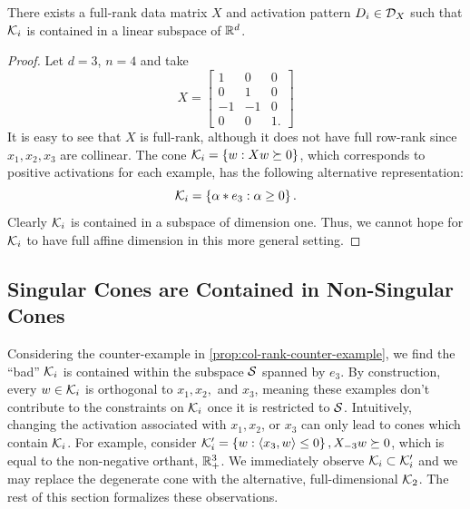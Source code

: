 \begin{proposition}\label{prop:col-rank-counter-example}
    There exists a full-rank data matrix \( X \) and activation pattern \( D_i \in \mathcal{D}_X \) such that \( \mathcal{K}_i \) is contained in a linear subspace of \( \mathbb{R}^d \).
\end{proposition}
\begin{proof}
    Let \( d = 3 \), \( n = 4 \) and take
    \begin{equation*}
        X =
        \begin{bmatrix}
            1  & 0  & 0  \\
            0  & 1  & 0  \\
            -1 & -1 & 0  \\
            0  & 0  & 1.
        \end{bmatrix}
    \end{equation*}
    It is easy to see that \( X \) is full-rank, although it does not have full row-rank since \( x_1, x_2, x_3 \) are collinear.
    The cone \( \mathcal{K}_i = \left\{ w : X w \succeq 0 \right\} \), which corresponds to positive activations for each example, has the following alternative representation:
    \[
        \mathcal{K}_i = \left\{\alpha * e_3 : \alpha \geq 0 \right\}.
    \]
    Clearly \( \mathcal{K}_i \) is contained in a subspace of dimension one.
    Thus, we cannot hope for \( \mathcal{K}_i \) to have full affine dimension in this more general setting.
\end{proof}

\subsection{Singular Cones are Contained in Non-Singular Cones}\label{app:singular-cones}

Considering the counter-example in \cref{prop:col-rank-counter-example}, we find the ``bad'' \( \mathcal{K}_i \) is contained within the subspace \( \mathcal{S} \) spanned by \( e_3 \).
By construction, every \( w \in \mathcal{K}_i \) is orthogonal to \( x_1, x_2, \) and \( x_3 \), meaning these examples don't contribute to the constraints on \( \mathcal{K}_i \) once it is restricted to \( \mathcal{S} \).
Intuitively, changing the activation associated with \( x_1, x_2 \), or \( x_3 \) can only lead to cones which contain \( \mathcal{K}_i \).
For example, consider \( \mathcal{K}_i' = \left\{w : \left\langle x_3, w\right\rangle \leq 0\right\}, X_{-3} w \succeq 0 \), which is equal to the non-negative orthant, \( \mathbb{R}^3_+ \).
We immediately observe \( \mathcal{K}_i \subset \mathcal{K}_i' \) and we may replace the degenerate cone with the alternative, full-dimensional \( \mathcal{K}_2 \).
The rest of this section formalizes these observations.

